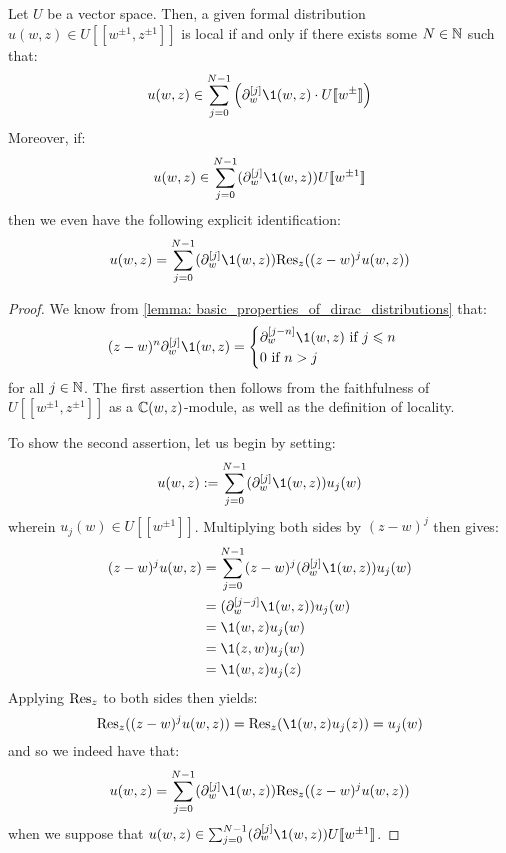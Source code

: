         \begin{lemma} \label{lemma: cauchy_integration_formula}
            Let $U$ be a vector space. Then, a given formal distribution $u(w, z) \in U[\![w^{\pm 1}, z^{\pm 1}]\!]$ is local if and only if there exists some $N \in \mathbb{N}$ such that:
                $$u(w, z) \in \sum_{j = 0}^{N - 1} \left( \del_w^{[j]} \1(w, z) \cdot U[\![w^{\pm}]\!] \right)$$
            Moreover, if:
                $$u(w, z) \in \sum_{j = 0}^{N - 1} ( \del_w^{[j]} \1(w, z) ) U[\![w^{\pm 1}]\!]$$
            then we even have the following explicit identification:
                $$u(w, z) = \sum_{j = 0}^{N - 1} ( \del_w^{[j]} \1(w, z) ) \Res_z( (z - w)^j u(w, z) )$$
        \end{lemma}
            \begin{proof}
                We know from \ref{lemma: basic_properties_of_dirac_distributions} that:
                    $$
                        (z - w)^n \del_w^{[j]} \1(w, z) =
                        \begin{cases}
                            \text{$\del_w^{[j - n]} \1(w, z)$ if $j \leq n$}
                            \\
                            \text{$0$ if $n > j$}
                        \end{cases}
                    $$
                for all $j \in \mathbb{N}$. The first assertion then follows from the faithfulness of $U[\![w^{\pm 1}, z^{\pm 1}]\!]$ as a $\mathbb{C}(w, z)$-module, as well as the definition of locality.

                To show the second assertion, let us begin by setting:
                    $$u(w, z) := \sum_{j = 0}^{N - 1} ( \del_w^{[j]} \1(w, z) ) u_j(w)$$
                wherein $u_j(w) \in U[\![w^{\pm 1}]\!]$. Multiplying both sides by $(z - w)^j$ then gives:
                    $$
                        \begin{aligned}
                            (z - w)^j u(w, z) & = \sum_{j = 0}^{N - 1} (z - w)^j ( \del_w^{[j]} \1(w, z) ) u_j(w)
                            \\
                            & = ( \del_w^{[j - j]} \1(w, z) ) u_j(w)
                            \\
                            & = \1(w, z) u_j(w)
                            \\
                            & = \1(z, w) u_j(w)
                            \\
                            & = \1(w, z) u_j(z)
                        \end{aligned}
                    $$
                Applying $\mathrm{Res}_z$ to both sides then yields:
                    $$\Res_z( (z - w)^j u(w, z) ) = \Res_z( \1(w, z) u_j(z) ) = u_j(w)$$
                and so we indeed have that:
                    $$u(w, z) = \sum_{j = 0}^{N - 1} ( \del_w^{[j]} \1(w, z) ) \Res_z( (z - w)^j u(w, z) )$$
                when we suppose that $u(w, z) \in \sum_{j = 0}^{N - 1} ( \del_w^{[j]} \1(w, z) ) U[\![w^{\pm 1}]\!]$.
            \end{proof}
